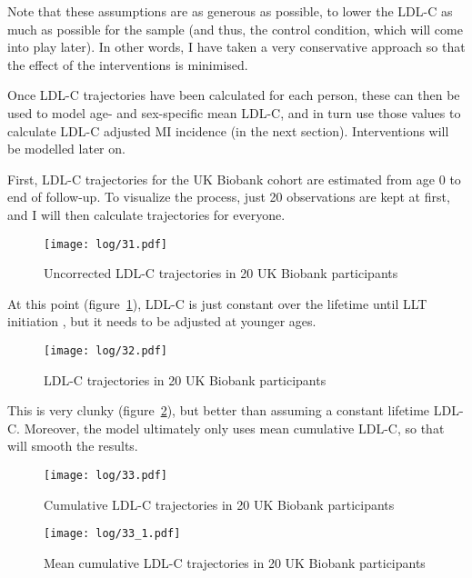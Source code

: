 \documentclass[11pt]{article}
\begin{document}
Note that these assumptions are as generous as possible, to lower the LDL-C as much as possible for 
the sample (and thus, the control condition, which will come into play later). In other words, 
I have taken a very conservative approach so that the effect of the interventions is minimised. 

Once LDL-C trajectories have been calculated for each person, these can then be used to
model age- and sex-specific mean LDL-C, and in turn use those values to calculate LDL-C adjusted MI incidence (in the next section). 
Interventions will be modelled later on. 

First, LDL-C trajectories for the UK Biobank cohort are estimated from age 0 to end of follow-up. 
To visualize the process, just 20 observations are kept at first, and 
I will then calculate trajectories for everyone. 

\color{Blue4}
\begin{figure}
    \centering
    \texttt{[image: log/31.pdf]}
    \caption{Uncorrected LDL-C trajectories in 20 UK Biobank participants}
    \label{LDL201}
\end{figure}
\begin{stlog}\end{stlog}
\color{black}

At this point (figure~\ref{LDL201}), LDL-C is just constant over the lifetime until LLT initiation
, but it needs to be adjusted at younger ages.

\color{Blue4}
\begin{figure}
    \centering
    \texttt{[image: log/32.pdf]}
    \caption{LDL-C trajectories in 20 UK Biobank participants}
    \label{LDLage20}
\end{figure}
\begin{stlog}\end{stlog}
\color{black}

This is very clunky (figure~\ref{LDLage20}), but better than assuming a constant lifetime LDL-C.
Moreover, the model ultimately only uses mean cumulative LDL-C, so that will smooth the 
results. 

\color{Blue4}
\begin{figure}
    \centering
    \texttt{[image: log/33.pdf]}
    \caption{Cumulative LDL-C trajectories in 20 UK Biobank participants}
    \label{cumLDLage20}
\end{figure}
\begin{figure}
    \centering
    \texttt{[image: log/33\_1.pdf]}
    \caption{Mean cumulative LDL-C trajectories in 20 UK Biobank participants}
    \label{aveLDLage20}
\end{figure}
\begin{stlog}\end{stlog}
\color{black}
\end{document}
